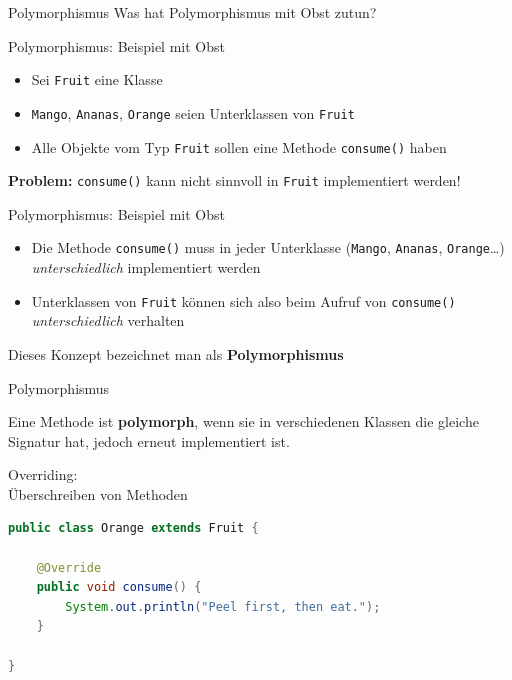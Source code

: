 \documentclass[18pt]{beamer}
\begin{document}
\begin{frame}{Polymorphismus}
    Was hat Polymorphismus mit Obst zutun?
\end{frame}

\begin{frame}{Polymorphismus: Beispiel mit Obst}
    \begin{itemize}
        \item Sei \texttt{Fruit} eine Klasse
        \item \texttt{Mango}, \texttt{Ananas}, \texttt{Orange} seien Unterklassen von \texttt{Fruit}
        \pause
        \vspace{.3in}
        \item Alle Objekte vom Typ \texttt{Fruit} sollen eine Methode \texttt{consume()} haben
    \end{itemize}
        \pause
        \vspace{.3in}
        \textbf{Problem:} \texttt{consume()} kann nicht sinnvoll in \texttt{Fruit} implementiert werden!
\end{frame}

\begin{frame}{Polymorphismus: Beispiel mit Obst}

    \begin{itemize}
        \item Die Methode \texttt{consume()} muss in jeder Unterklasse (\texttt{Mango}, \texttt{Ananas}, \texttt{Orange}\dots) \textit{unterschiedlich} implementiert werden
        \item Unterklassen von \texttt{Fruit} können sich also beim Aufruf von \texttt{consume()} \textit{unterschiedlich} verhalten
    \end{itemize}

    \pause
    \vspace{.2in}

    Dieses Konzept bezeichnet man als \textbf{Polymorphismus}
\end{frame}

\begin{frame}{Polymorphismus}
    \begin{block}{}
        Eine Methode ist \textbf{polymorph}, wenn sie in verschiedenen Klassen die gleiche Signatur hat,
        jedoch erneut implementiert ist.
    \end{block}
\end{frame}

\begin{frame}[fragile]{Overriding:\\ Überschreiben von Methoden}
    \begin{exampleblock}{}
        \begin{lstlisting}[language=Java,basicstyle=\scriptsize]
public class Orange extends Fruit {

    @Override
    public void consume() {
        System.out.println("Peel first, then eat.");
    }

}
        \end{lstlisting}

    \end{exampleblock}

\end{frame}
\end{document}
